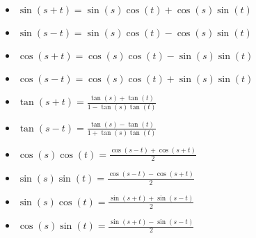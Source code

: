 \documentclass[12pt,a4paper,titlepage]{article}
\begin{document}
\begin{SummaryBox}[title=Trigonometric identities]
                \begin{SummaryExtensionBox}[title=Sum/Difference identities]
                    \begin{multicols}{2}
                        \begin{itemize}[leftmargin=*]
                            \item $\sin(s+t) = \sin(s)\cos(t) + \cos(s)\sin(t)$    
                            \item $\sin(s-t) = \sin(s)\cos(t) - \cos(s)\sin(t)$
                            \item $\cos(s+t) = \cos(s)\cos(t) - \sin(s)\sin(t)$
                            \item $\cos(s-t) = \cos(s)\cos(t) + \sin(s)\sin(t)$
                            \item $\tan(s+t) = \frac{\tan(s) + \tan(t)}{1 - \tan(s)\tan(t)}$
                            \item $\tan(s-t) = \frac{\tan(s) - \tan(t)}{1 + \tan(s)\tan(t)}$
                        \end{itemize}
                    \end{multicols}
                \end{SummaryExtensionBox}
                
                \begin{SummaryExtensionBox}[title=Product-to-sum identities]
                    \begin{multicols}{2}
                        \begin{itemize}[leftmargin=*]
                            \item $\cos(s)\cos(t) = \frac{\cos(s-t) + \cos(s+t)}{2}$
                            \item $\sin(s)\sin(t) = \frac{\cos(s-t) - \cos(s+t)}{2}$
                            \item $\sin(s)\cos(t) = \frac{\sin(s+t) + \sin(s-t)}{2}$
                            \item $\cos(s)\sin(t) = \frac{\sin(s+t) - \sin(s-t)}{2}$
                        \end{itemize}
                    \end{multicols}
                \end{SummaryExtensionBox}
                

\end{SummaryBox}
\end{document}
